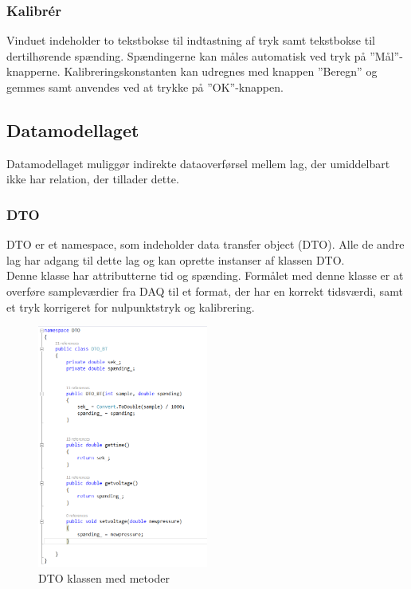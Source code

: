 \subsubsection{Kalibrér}
Vinduet indeholder to tekstbokse til indtastning af tryk samt tekstbokse til dertilhørende spænding. Spændingerne kan måles automatisk ved tryk på ”Mål”\--knapperne.
Kalibreringskonstanten kan udregnes med knappen ”Beregn” og gemmes samt anvendes ved at trykke på ”OK”\--knappen.

\subsection{Datamodellaget}
Datamodellaget muliggør indirekte dataoverførsel mellem lag, der umiddelbart ikke har relation, der tillader dette.

\subsubsection{DTO}
DTO er et namespace, som indeholder data transfer object (DTO). Alle de andre lag har adgang til dette lag og kan oprette instanser af klassen DTO.\\
Denne klasse har attributterne tid og spænding. Formålet med denne klasse er at overføre sampleværdier fra DAQ til et format, der har en korrekt tidsværdi, samt et tryk korrigeret for nulpunktstryk og kalibrering.
\begin{figure}[H]
	\centering
	\includegraphics[width=0.5\textwidth]{Figurer/DTO_kode}
	\caption{DTO klassen med metoder}
\end{figure}

